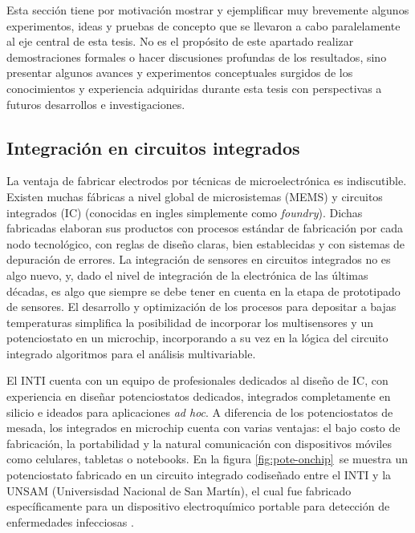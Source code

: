 		Esta sección tiene por motivación mostrar y ejemplificar muy brevemente algunos experimentos, ideas y pruebas de concepto que se llevaron a cabo paralelamente al eje central de esta tesis. No es el propósito de este apartado realizar demostraciones formales o hacer discusiones profundas de los resultados, sino presentar algunos avances y experimentos conceptuales surgidos de los conocimientos y experiencia adquiridas durante esta tesis con perspectivas a futuros desarrollos e investigaciones.
  
  \subsection{Integración en circuitos integrados}

	  La ventaja de fabricar electrodos por técnicas de microelectrónica es indiscutible. Existen muchas fábricas a nivel global de microsistemas (MEMS) y circuitos integrados (IC) (conocidas en ingles simplemente como \textit{foundry}). Dichas fabricadas elaboran sus productos con procesos estándar de fabricación por cada nodo tecnológico, con reglas de diseño claras, bien establecidas y con sistemas de depuración de errores. La integración de sensores en circuitos integrados no es algo nuevo, y, dado el nivel de integración de la electrónica de las últimas décadas, es algo que siempre se debe tener en cuenta en la etapa de prototipado de sensores.\cite{Wang2012,Liu1993,Novell2012,Yu2013,Sarkar2014} El desarrollo y optimización de los procesos para depositar \pdm\space a bajas temperaturas simplifica la posibilidad de incorporar los multisensores y un potenciostato en un microchip, incorporando a su vez en la lógica del circuito integrado algoritmos para el análisis multivariable.

	  El INTI cuenta con un equipo de profesionales dedicados al diseño de IC, con experiencia en diseñar potenciostatos dedicados, integrados completamente en silicio e ideados para aplicaciones \textit{ad hoc}\cite{sanmartin2011}. A diferencia de los potenciostatos de mesada, los integrados en microchip cuenta con varias ventajas: el bajo costo de fabricación, la portabilidad y la natural comunicación con dispositivos móviles como celulares, tabletas o notebooks.\cite{longinotti2010,Salomon2014} En la figura \ref{fig:pote-onchip} se muestra un potenciostato fabricado en un circuito integrado codiseñado entre el INTI y la UNSAM (Universisdad Nacional de San Martín), el cual fue fabricado específicamente para un dispositivo electroquímico portable para detección de enfermedades infecciosas \cite{Kuo2018}.	 
 			
